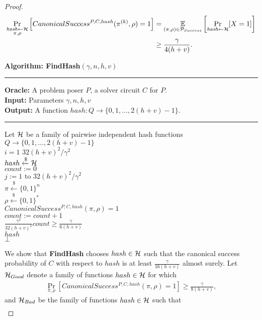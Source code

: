 \begin{proof}
\begin{align}
  \label{ineq:hash_high_prob}
\underset{\substack{\textit{hash} \leftarrow \mathcal{H} \\ \pi, \rho}}{\Pr}\left[CanonicalSuccess^{P, C, hash}(\pi^{(k)}, \rho) = 1\right] &=
\underset{{(\pi,\rho) \in \mathcal{P}_{Success}}}{\mathbb{E}}\left[\underset{\substack{\textit{hash} \leftarrow \mathcal{H}}}{\Pr}[X = 1]\right] \notag\\
&\geq \frac{\gamma}{4(h+v)}.
\end{align}
%
\begin{codeblock}
  \textbf{Algorithm: FindHash}$(\gamma, n, h, v)$
  \medskip
  \hrule
  \medskip
  \textbf{Oracle:} A problem poser $P$, a solver circuit $C$ for $P$.\\
  \textbf{Input:} Parameters $\gamma, n, h,v $\\
  \textbf{Output:} A function $hash:Q \rightarrow \{0,1, \dots, 2(h+v)-1 \}$.
  \medskip\hrule\medskip
  Let $\mathcal{H}$ be a family of pairwise independent hash functions $Q \rightarrow \{0,1,\dots, 2(h+v)-1\}$\\
  \For $i = 1$ \To $32(h+v)^2/\gamma^2$ \Do \\
  \IndI $hash \xleftarrow{\$} \mathcal{H}$ \\
  \IndI $count := 0$ \\
  \IndI \For $j := 1$ to $32(h+v)^2/\gamma^2$ \Do \\
  \IndII $\pi \xleftarrow{\$} \{0,1\}^{n} $\\
  \IndII $\rho \xleftarrow{\$} \{0,1\}^*$ \\
  \IndII \If $CanonicalSuccess^{P, C, hash}(\pi, \rho) = 1$ \then \\
  \IndIII $count := count + 1$\\
  \IndI \If $\frac{\gamma^2}{32(h+v)^2} count \geq \frac{\gamma}{6(h+v)}$ \then \\
  \IndII \return $hash$\\
  \return $\bot$
\end{codeblock}
We show that \textbf{FindHash} chooses $hash \in \mathcal{H}$ such that the canonical success probability of $C$
with respect to $hash$ is at least $\frac{\gamma}{16(h+v)}$ almost surely.
Let $\mathcal{H}_{Good}$ denote a family of functions $hash \in \mathcal{H}$ for which
\begin{align}
  \label{eq:hash_good}
\underset{\pi, \rho}{\Pr}\left[CanonicalSuccess^{P, C, hash}(\pi, \rho) = 1\right] \geq \frac{\gamma}{8(h+v)},
\end{align}
and $\mathcal{H}_{Bad}$ be the family of functions $hash \in \mathcal{H}$ such that
\begin{align}

\end{align}
\end{proof}
